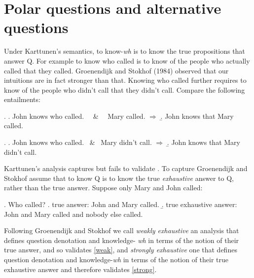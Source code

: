 





%

\section{Polar questions and alternative questions}

Under Karttunen's semantics, to know-{\it wh} is to know the true
propositions that answer Q. For example to know who called is to
know of the people who actually called that they called.
Groenendijk and Stokhof (1984) observed that our intuitions are in
fact stronger than that. Knowing who called further requires to
know of the people who didn't call that they didn't call. Compare
the following entailments:



\ex. \label{weak} \a. John knows who called.  \ \ \& \ \ Mary
called. $\Rightarrow$ \b.  John knows that Mary called.



\ex. \label{strong} \a. John knows who called.  \   \& \    Mary
didn't call. $\Rightarrow$ \b.  John knows that Mary didn't call.


\noindent Karttunen's analysis   captures \LLast but fails to
validate \Last. To capture \Last Groenendijk and Stokhof assume
that to know Q is to know the true {\it exhaustive} answer to Q,
rather than the true answer. Suppose only Mary and John called:

 \ex.   Who called?
 \a. true answer: John and  Mary called.
 \b. true exhaustive answer: John and Mary   called and  nobody else called.


Following Groenendijk and Stokhof we call \emph{weakly exhaustive}
an analysis that defines question denotation and knowledge-{\it
wh} in terms of the notion of their true answer, and so validates
\ref{weak}, and \emph{strongly exhaustive} one that defines
question denotation and knowledge-{\it wh} in terms of the notion
of  their true exhaustive answer and therefore validates
\ref{strong}.

